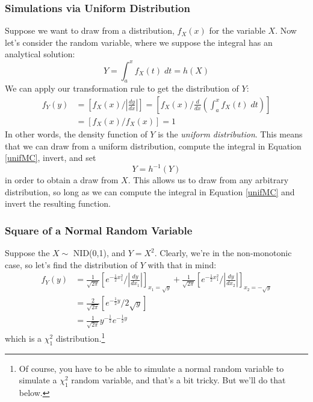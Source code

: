 \documentclass[a4paper,12pt]{scrartcl}
\begin{document}
\subsubsection{Simulations via Uniform Distribution}

Suppose we want to draw from a distribution, $f_X(x)$ for the variable
$X$. Now let's consider the random variable, where we suppose
the integral has an analytical solution:
\begin{equation}
   \label{unifMC}
   Y = \int^x_a f_X(t) \; dt = h(X) 
\end{equation}
We can apply our transformation rule to get the distribution of $Y$:
\begin{align*}
    f_Y(y) &= \left[ f_X(x) / \left\lvert\frac{dy}{dx} \right\rvert
       \right] =\left[ f_X(x) / \frac{d}{dx} \left( \int^x_a 
	  f_X(t)\; dt\right) \right] \\
      &=\left[ f_X(x) / f_X(x) \right]  = 1
\end{align*}
In other words, the density function of $Y$ is the \emph{uniform
distribution}. This means that we can draw from a uniform 
distribution, compute the integral in Equation \ref{unifMC}, invert,
and set
   \[ Y = h^{-1}(Y) \]
in order to obtain a draw from $X$. This allows us to draw from
any arbitrary distribution, so long as we can compute the integral
in Equation \ref{unifMC} and invert the resulting function.



\subsubsection{Square of a Normal Random Variable}

Suppose the $X\sim$ NID(0,1), and $Y = X^2$. Clearly, we're in 
the non-monotonic case, so let's find the distribution of $Y$ with
that in mind:
\begin{align*}
   f_Y(y) &= \frac{1}{\sqrt{2\pi}} \left[ e^{-\frac{1}{2}x_1^2}/
      \left\lvert \frac{dy}{dx_1}\right\rvert \right]_{x_1 = \sqrt{y}} +
      \frac{1}{\sqrt{2\pi}} \left[ e^{-\frac{1}{2}x_1^2}/
      \left\lvert \frac{dy}{dx_2}\right\rvert \right]_{x_2 =-\sqrt{y}}\\
   &= \frac{2}{\sqrt{2\pi}} \left[ e^{-\frac{1}{2} y} / 2\sqrt{y}
      \right ] \\
   &= \frac{1}{\sqrt{2\pi}} y^{-\frac{1}{2}} e^{-\frac{1}{2} y}
\end{align*}
which is a $\chi^2_1$ distribution.\footnote{Of course, you have
to be able to simulate a normal random variable to simulate a 
$\chi^2_1$ random variable, and that's a bit tricky. But we'll do 
that below.} 
\end{document}
